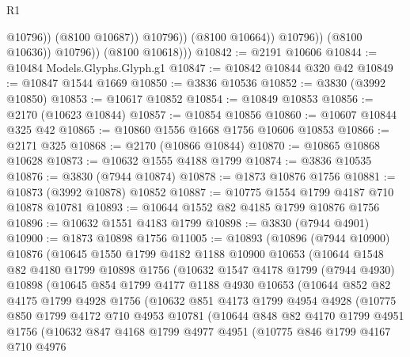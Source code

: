 \begin{lexlean}{R1}
\begin{coremodule}
                              @10796))
                          (@8100 @10687))
                        @10796))
                    (@8100 @10664))
                  @10796))
              (@8100 @10636))
            @10796))
        (@8100 @10618)))
@10842 := @2191 @10606
@10844 := @10484 Models.Glyphs.Glyph.g1
@10847 := @10842 @10844 @320 @42
@10849 := @10847 @1544 @1669
@10850 := @3836 @10536
@10852 := @3830 (@3992 @10850)
@10853 := @10617 @10852
@10854 := @10849 @10853
@10856 := @2170 (@10623 @10844)
@10857 := @10854 @10856
@10860 := @10607 @10844 @325 @42
@10865 := @10860 @1556 @1668 @1756 @10606 @10853
@10866 := @2171 @325
@10868 := @2170 (@10866 @10844)
@10870 := @10865 @10868 @10628
@10873 := @10632 @1555 @4188 @1799
@10874 := @3836 @10535
@10876 := @3830 (@7944 @10874)
@10878 := @1873 @10876 @1756
@10881 := @10873 (@3992 @10878) @10852
@10887 := @10775 @1554 @1799 @4187 @710 @10878 @10781
@10893 := @10644 @1552 @82 @4185 @1799 @10876 @1756
@10896 := @10632 @1551 @4183 @1799
@10898 := @3830 (@7944 @4901)
@10900 := @1873 @10898 @1756
@11005 := @10893
    (@10896
      (@7944 @10900)
      @10876
      (@10645
        @1550
        @1799
        @4182
        @1188
        @10900
        @10653
        (@10644
          @1548
          @82
          @4180
          @1799
          @10898
          @1756
          (@10632
            @1547
            @4178
            @1799
            (@7944 @4930)
            @10898
            (@10645
              @854
              @1799
              @4177
              @1188
              @4930
              @10653
              (@10644
                @852
                @82
                @4175
                @1799
                @4928
                @1756
                (@10632
                  @851
                  @4173
                  @1799
                  @4954
                  @4928
                  (@10775
                    @850
                    @1799
                    @4172
                    @710
                    @4953
                    @10781
                    (@10644
                      @848
                      @82
                      @4170
                      @1799
                      @4951
                      @1756
                      (@10632
                        @847
                        @4168
                        @1799
                        @4977
                        @4951
                        (@10775
                          @846
                          @1799
                          @4167
                          @710
                          @4976

\end{coremodule}
\end{lexlean}
